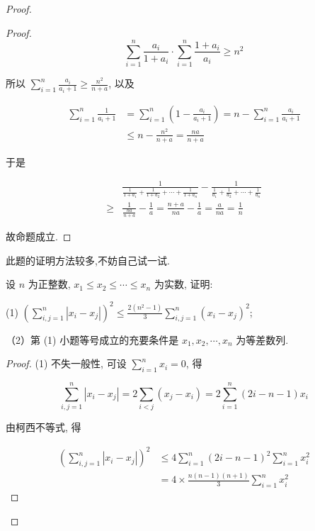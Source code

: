 \begin{proof}
\begin{proof}
	$$
	\sum_{i=1}^{n} \frac{a_{i}}{1+a_{i}} \cdot \sum_{i=1}^{n} \frac{1+a_{i}}{a_{i}} \geqslant n^{2}
	$$
	
	所以 $\sum_{i=1}^{n} \frac{a_{i}}{a_{i}+1} \geqslant \frac{n^{2}}{n+a}$, 以及
	
	$$
	\begin{aligned}
	\sum_{i=1}^{n} \frac{1}{a_{i}+1} & =\sum_{i=1}^{n}\left(1-\frac{a_{i}}{a_{i}+1}\right)=n-\sum_{i=1}^{n} \frac{a_{i}}{a_{i}+1} \\
	& \leqslant n-\frac{n^{2}}{n+a}=\frac{n a}{n+a}
	\end{aligned}
	$$
	
	于是
	
	$$
	\begin{aligned}
	& \frac{1}{\frac{1}{1+a_{1}}+\frac{1}{1+a_{2}}+\cdots+\frac{1}{1+a_{n}}}-\frac{1}{\frac{1}{a_{1}}+\frac{1}{a_{2}}+\cdots+\frac{1}{a_{n}}} \\
	\geqslant & \frac{1}{\frac{n a}{n+a}}-\frac{1}{a}=\frac{n+a}{n a}-\frac{1}{a}=\frac{a}{n a}=\frac{1}{n}
	\end{aligned}
	$$
	
	故命题成立.
\end{proof}
\begin{note}
	此题的证明方法较多,不妨自己试一试.
\end{note}

\begin{example}
	设 $n$ 为正整数, $x_{1} \leqslant x_{2} \leqslant \cdots \leqslant x_{n}$ 为实数, 证明:
	
	(1) $\left(\sum_{i, j=1}^{n}\left|x_{i}-x_{j}\right|\right)^{2} \leqslant \frac{2\left(n^{2}-1\right)}{3} \sum_{i, j=1}^{n}\left(x_{i}-x_{j}\right)^{2}$;
	
	（2）第 (1) 小题等号成立的充要条件是 $x_{1}, x_{2}, \cdots, x_{n}$ 为等差数列.
\end{example}
\begin{proof}
	(1) 不失一般性, 可设 $\sum_{i=1}^{n} x_{i}=0$, 得
	
	$$
	\sum_{i, j=1}^{n}\left|x_{i}-x_{j}\right|=2 \sum_{i<j}\left(x_{j}-x_{i}\right)=2 \sum_{i=1}^{n}(2 i-n-1) x_{i}
	$$
	
	由柯西不等式, 得
	
	$$
	\begin{aligned}
	\left(\sum_{i, j=1}^{n}\left|x_{i}-x_{j}\right|\right)^{2} & \leqslant 4 \sum_{i=1}^{n}(2 i-n-1)^{2} \sum_{i=1}^{n} x_{i}^{2} \\
	& =4 \times \frac{n(n-1)(n+1)}{3} \sum_{i=1}^{n} x_{i}^{2}
	\end{aligned}
	$$
	

\end{proof}
\end{proof}

